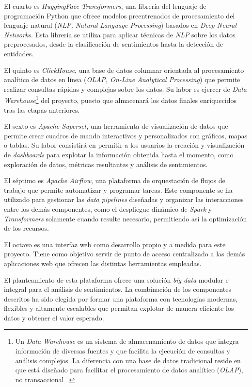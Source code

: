 El cuarto es \textit{HuggingFace Transformers}, una librería del lenguaje de programación Python que ofrece modelos preentrenados de procesamiento del lenguaje natural (\textit{NLP, Natural Language Processing}) basados en \textit{Deep Neural Networks}. Esta librería se utiliza para aplicar técnicas de \textit{NLP} sobre los datos preprocesados, desde la clasificación de sentimientos hasta la detección de entidades. 

El quinto es \textit{ClickHouse}, una base de datos columnar orientada al procesamiento analítico de datos en línea (\textit{OLAP, On-Line Analytical Processing}) que permite realizar consultas rápidas y complejas sobre los datos. Su labor es ejercer de \textit{Data Warehouse}\footnote{Un \textit{Data Warehouse} es un sistema de almacenamiento de datos que integra información de diversas fuentes y que facilita la ejecución de consultas y análisis complejos. La diferencia con una base de datos tradicional reside en que está diseñado para facilitar el procesamiento de datos analítico (\textit{OLAP}), no transaccional~\cite{sasDataWarehouse}.} del proyecto, puesto que almacenará los datos finales enriquecidos tras las etapas anteriores.

El sexto es \textit{Apache Superset}, una herramienta de visualización de datos que permite crear cuadros de mando interactivos y personalizados con gráficos, mapas o tablas. Su labor consistirá en permitir a los usuarios la creación y visualización de \textit{dashboards} para explotar la información obtenida hasta el momento, como exploración de datos, métricas resultantes y análisis de sentimientos.

El séptimo es \textit{Apache Airflow}, una plataforma de orquestación de flujos de trabajo que permite automatizar y programar tareas. Este componente se ha utilizado para gestionar las \textit{data pipelines} diseñadas y organizar las interacciones entre los demás componentes, como el despliegue dinámico de \textit{Spark} y \textit{Transformers} solamente cuando resulte necesario, permitiendo así la optimización de los recursos.

El octavo es una interfaz web como desarrollo propio y a medida para este proyecto. Tiene como objetivo servir de punto de acceso centralizado a las demás aplicaciones web que ofrecen las distintas herramientas empleadas.

El planteamiento de esta plataforma ofrece una solución \textit{big data} modular e integral para el análisis de sentimientos. La combinación de los componentes descritos ha sido elegida por formar una plataforma con tecnologías modernas, flexibles y altamente escalables que permitan explotar de manera eficiente los datos y obtener el valor esperado.
